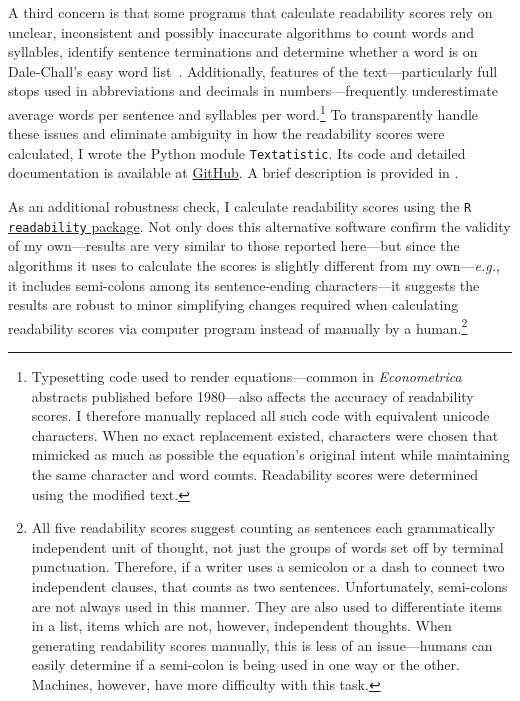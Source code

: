 A third concern is that some programs that calculate readability scores rely on unclear, inconsistent and possibly inaccurate algorithms to count words and syllables, identify sentence terminations and determine whether a word is on Dale-Chall's easy word list~\citep[for a discussion, see][]{Sirico2007}. Additionally, features of the text---particularly full stops used in abbreviations and decimals in numbers---frequently underestimate average words per sentence and syllables per word.\footnote{Typesetting code used to render equations---common in \emph{Econometrica} abstracts published before 1980---also affects the accuracy of readability scores. I therefore manually replaced all such code with equivalent unicode characters. When no exact replacement existed, characters were chosen that mimicked as much as possible the equation's original intent while maintaining the same character and word counts. Readability scores were determined using the modified text.} To transparently handle these issues and eliminate ambiguity in how the readability scores were calculated, I wrote the Python module \texttt{Textatistic}. Its code and detailed documentation is available at \href{https://github.com/erinhengel/Textatistic}{GitHub}. A brief description is provided in .

As an additional robustness check, I calculate readability scores using the \texttt{R} \href{https://github.com/trinker/readability}{\texttt{readability} package}. Not only does this alternative software confirm the validity of my own---results are very similar to those reported here---but since the algorithms it uses to calculate the scores is slightly different from my own---\emph{e.g.}, it includes semi-colons among its sentence-ending characters---it suggests the results are robust to minor simplifying changes required when calculating readability scores via computer program instead of manually by a human.\footnote{All five readability scores suggest counting as sentences each grammatically independent unit of thought, not just the groups of words set off by terminal punctuation. Therefore, if a writer uses a semicolon or a dash to connect two independent clauses, that counts as two sentences. Unfortunately, semi-colons are not always used in this manner. They are also used to differentiate items in a list, items which are not, however, independent thoughts. When generating readability scores manually, this is less of an issue---humans can easily determine if a semi-colon is being used in one way or the other. Machines, however, have more difficulty with this task.} 

